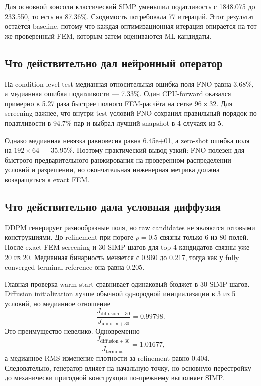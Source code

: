 Для основной консоли классический SIMP уменьшил податливость с 1848.075 до 233.550, то есть на 87.36\%. Сходимость потребовала 77 итераций. Этот результат остаётся baseline, потому что каждая оптимизационная итерация опирается на тот же проверенный FEM, которым затем оцениваются ML-кандидаты.

\subsection{Что действительно дал нейронный оператор}
\label{subsec:practical-v09-fno-role}

На condition-level test медианная относительная ошибка поля FNO равна 3.68\%, а медианная ошибка податливости --- 7.33\%. Один CPU-forward оказался примерно в 5.27 раза быстрее полного FEM-расчёта на сетке $96\times32$. Для screening важнее, что внутри test-условий FNO сохранил правильный порядок по податливости в 94.7\% пар и выбрал лучший snapshot в 4 случаях из 5.

Однако медианная невязка равновесия равна 6.45e+01, а zero-shot ошибка поля на $192\times64$ --- 35.95\%. Поэтому практический вывод узкий: FNO полезен для быстрого предварительного ранжирования на проверенном распределении условий и разрешении, но окончательная инженерная метрика должна возвращаться к exact FEM.

\subsection{Что действительно дала условная диффузия}
\label{subsec:practical-v09-ddpm-role}

DDPM генерирует разнообразные поля, но raw candidates не являются готовыми конструкциями. До refinement при пороге $\rho=0.5$ связны только 6 из 80 полей. После exact FEM screening и $30$ SIMP-шагов для top-$4$ кандидатов связны уже 20 из 20. Медианная бинарность меняется с 0.960 до 0.217, тогда как у fully converged terminal reference она равна 0.205.

Главная проверка warm start сравнивает одинаковый бюджет в $30$ SIMP-шагов. Diffusion initialization лучше обычной однородной инициализации в 3 из 5 условий, но медианное отношение
\begin{equation}
\label{eq:practical-v09-warmstart-ratio}
 \frac{J_{\mathrm{diffusion}+30}}
 {J_{\mathrm{uniform}+30}}
 =
 0.99798.
\end{equation}
Это преимущество невелико. Одновременно
\begin{equation}
\label{eq:practical-v09-terminal-gap}
 \frac{J_{\mathrm{diffusion}+30}}
 {J_{\mathrm{terminal}}}
 =
 1.01677,
\end{equation}
а медианное RMS-изменение плотности за refinement равно 0.404. Следовательно, генератор влияет на начальную точку, но основную перестройку до механически пригодной конструкции по-прежнему выполняет SIMP.

